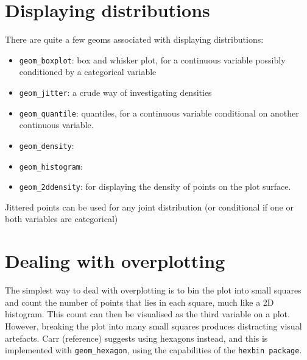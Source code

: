 \section{Displaying distributions}\label{sec:distributions}

There are quite a few geoms associated with displaying distributions:

\begin{itemize}
	\item {\tt geom\_boxplot}: box and whisker plot, for a continuous variable possibly conditioned by a categorical variable
	\item {\tt geom\_jitter}: a crude way of investigating densities
	\item {\tt geom\_quantile}: quantiles, for a continuous variable conditional on another continuous variable.
	\item {\tt geom\_density}: 
	\item {\tt geom\_histogram}: 
	\item {\tt geom\_2ddensity}: for displaying the density of points on the plot surface.
\end{itemize}

% 
% 
%   
% 
% 

Jittered points can be used for any joint distribution (or conditional if one or both variables are categorical)

\section{Dealing with overplotting}\label{sec:overplotting}

The simplest way to deal with overplotting is to bin the plot into small squares and count the number of points that lies in each square, much like a 2D histogram.  This count can then be visualised as the third variable on a plot.  However, breaking the plot into many small squares produces distracting visual artefacts.  Carr (reference) suggests using hexagons instead, and this is implemented with {\tt geom\_hexagon}, using the capabilities of the {\tt hexbin package}.

